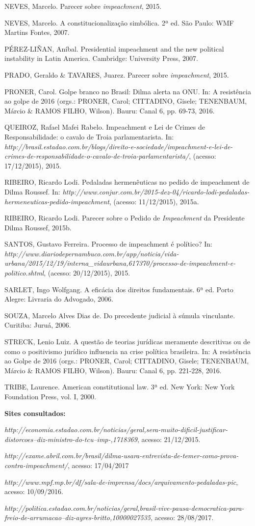 NEVES, Marcelo. Parecer sobre \emph{impeachment}, 2015.

NEVES, Marcelo. A constitucionalização simbólica. 2ª ed. São Paulo: WMF
Martins Fontes, 2007.

PÉREZ-LIÑAN, Aníbal. Presidential impeachment and the new political
instability in Latin America. Cambridge: University Press, 2007.

PRADO, Geraldo \& TAVARES, Juarez. Parecer sobre \emph{impeachment},
2015.

PRONER, Carol. Golpe branco no Brasil: Dilma alerta na ONU. In: A
resistência ao golpe de 2016 (orgs.: PRONER, Carol; CITTADINO, Gisele;
TENENBAUM, Márcio \& RAMOS FILHO, Wilson). Bauru: Canal 6, pp. 69-73,
2016.

QUEIROZ, Rafael Mafei Rabelo. Impeachment e Lei de Crimes de
Responsabilidade: o cavalo de Troia parlamentarista. In:
\emph{http://brasil.estadao.com.br/blogs/direito-e-sociedade/impeachment-e-lei-de-crimes-de-responsabilidade-o-cavalo-de-troia-parlamentarista/},
(acesso: 17/12/2015), 2015.

RIBEIRO, Ricardo Lodi. Pedaladas hermenêuticas no pedido de impeachment
de Dilma Roussef. In:
\emph{http://www.conjur.com.br/2015-dez-04/ricardo-lodi-pedaladas-hermeneuticas-pedido-impeachment},
(acesso: 11/12/2015), 2015a.

RIBEIRO, Ricardo Lodi. Parecer sobre o Pedido de \emph{Impeachment} da
Presidente Dilma Roussef, 2015b.

SANTOS, Gustavo Ferreira. Processo de impeachment é político? In:
\emph{http://www.diariodepernambuco.com.br/app/noticia/vida-urbana/2015/12/19/interna\_vidaurbana,617370/processo-de-impeachment-e-politico.shtml},
(acesso: 20/12/2015), 2015.

SARLET, Ingo Wolfgang. A eficácia dos direitos fundamentais. 6ª ed.
Porto Alegre: Livraria do Advogado, 2006.

SOUZA, Marcelo Alves Dias de. Do precedente judicial à súmula
vinculante. Curitiba: Juruá, 2006.

STRECK, Lenio Luiz. A questão de teorias jurídicas meramente descritivas
ou de como o positivismo jurídico influencia na crise política
brasileira. In: A resistência ao Golpe de 2016 (orgs.: PRONER, Carol;
CITTADINO, Gisele; TENENBAUM, Márcio \& RAMOS FILHO, Wilson). Bauru:
Canal 6, pp. 221-228, 2016.

TRIBE, Laurence. American constitutional law. 3ª ed. New York: New York
Foundation Press, vol. I, 2000.

\textbf{Sites consultados:}

\emph{http://economia.estadao.com.br/noticias/geral,sera-muito-dificil-justificar-distorcoes--diz-ministro-do-tcu--imp-,1718369},
acesso: 21/12/2015.

\emph{http://exame.abril.com.br/brasil/dilma-usara-entrevista-de-temer-como-prova-contra-impeachment/},
acesso: 17/04/2017

\emph{http://www.mpf.mp.br/df/sala-de-imprensa/docs/arquivamento-pedaladas-pic},
acesso: 10/09/2016.

\emph{http://politica.estadao.com.br/noticias/geral,brasil-vive-pausa-democratica-para-freio-de-arrumacao--diz-ayres-britto,10000027535},
acesso: 28/08/2017.
